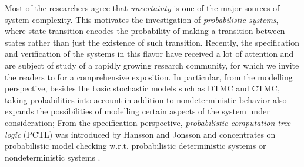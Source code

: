 \documentclass[times, 10 pt,twocolumn]{article}
\begin{document}
Most of the researchers agree that \emph{uncertainty} is one of
the major sources
of system complexity. %
This motivates the investigation of \emph{probabilistic systems},
where state transition encodes the probability of making a
transition between states rather than just the existence of such
transition. Recently, the specification and verification of the
systems in
this flavor %
have received a lot of attention and are subject of study of a
rapidly growing research community, for which we invite the
readers to \cite{BHHKS04} for a comprehensive exposition. In
particular, from the modelling perspective, besides the basic
stochastic models such as DTMC and CTMC, taking probabilities into
account in addition to nondeterministic behavior also expands the
possibilities of modelling certain aspects of the system under
consideration; From the specification perspective,
\emph{probabilistic computation tree logic} (PCTL) was introduced
by Hansson and Jonsson \cite{HJ94} and concentrates on
probabilistic model checking w.r.t. probabilistic deterministic
systems \cite{HJ94} or nondeterministic systems \cite{BdeA95}.
%
%
%
%



\end{document}
